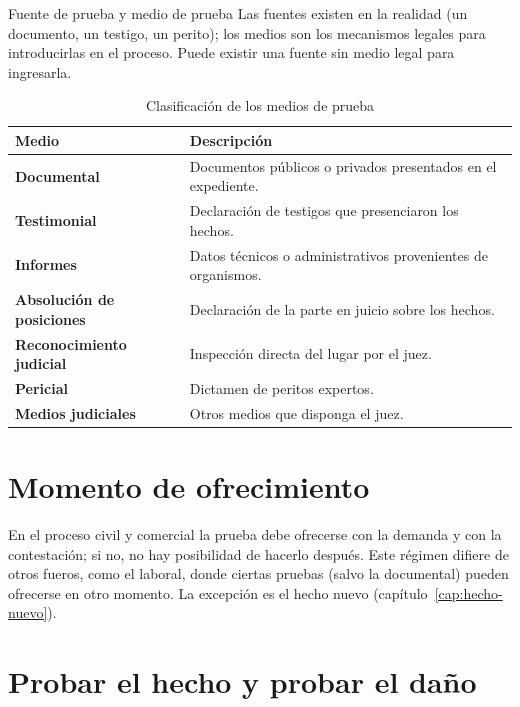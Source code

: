 \documentclass[12pt,oneside]{book}
\begin{document}
\begin{definicion}{Fuente de prueba y medio de prueba}
Las fuentes existen en la realidad (un documento, un testigo, un perito); los medios son los mecanismos legales para introducirlas en el proceso. Puede existir una fuente sin medio legal para ingresarla.
\end{definicion}

\begin{table}[H]
\centering
\caption{Clasificación de los medios de prueba}
\begin{tabularx}{\textwidth}{>{\raggedright\arraybackslash\bfseries}p{} X}
\toprule
Medio & Descripción \\
\midrule
Documental & Documentos públicos o privados presentados en el expediente. \\
Testimonial & Declaración de testigos que presenciaron los hechos. \\
Informes & Datos técnicos o administrativos provenientes de organismos. \\
Absolución de posiciones & Declaración de la parte en juicio sobre los hechos. \\
Reconocimiento judicial & Inspección directa del lugar por el juez. \\
Pericial & Dictamen de peritos expertos. \\
Medios judiciales & Otros medios que disponga el juez. \\
\bottomrule
\end{tabularx}
\end{table}

\section{Momento de ofrecimiento}

\begin{importante}
En el proceso civil y comercial la prueba debe ofrecerse con la demanda y con la contestación; si no, no hay posibilidad de hacerlo después. Este régimen difiere de otros fueros, como el laboral, donde ciertas pruebas (salvo la documental) pueden ofrecerse en otro momento. La excepción es el hecho nuevo (capítulo~\ref{cap:hecho-nuevo}).
\end{importante}

\section{Probar el hecho y probar el daño}
\end{document}
